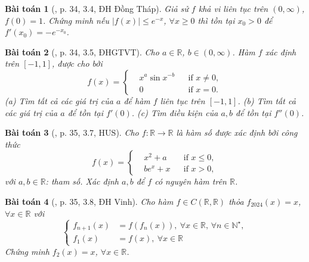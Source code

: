 \documentclass[oneside]{book}
\newtheorem{baitoan}{Bài toán}
\begin{document}
\begin{baitoan}[\cite{VMS_VMC2024}, p. 34, 3.4, ĐH Đồng Tháp]
	Giả sử $f$ khả vi liên tục trên $(0,\infty)$, $f(0) = 1$. Chứng minh nếu $|f(x)|\le e^{-x}$, $\forall x\ge0$ thì tồn tại $x_0 > 0$ để $f'(x_0) = -e^{-x_0}$.
\end{baitoan}

\begin{baitoan}[\cite{VMS_VMC2024}, p. 34, 3.5, ĐHGTVT]
	Cho $a\in\mathbb{R}$, $b\in(0,\infty)$. Hàm $f$ xác định trên $[-1,1]$, được cho bởi
	\begin{equation*}
		f(x) = \left\{\begin{split}
			&x^a\sin x^{-b}&&\mbox{if } x\ne0,\\
			&0&&\mbox{if } x = 0.
		\end{split}\right.
	\end{equation*}
	(a) Tìm tất cả các giá trị của $a$ để hàm $f$ liên tục trên $[-1,1]$. (b) Tìm tất cả các giá trị của $a$ để tồn tại $f'(0)$. (c) Tìm điều kiện của $a,b$ để tồn tại $f''(0)$.
\end{baitoan}

\begin{baitoan}[\cite{VMS_VMC2024}, p. 35, 3.7, HUS]
	Cho $f:\mathbb{R}\to\mathbb{R}$ là hàm số được xác định bởi công thức
	\begin{equation*}
		f(x) = \left\{\begin{split}
			&x^2 + a&&\mbox{if } x\le0,\\
			&be^x + x&&\mbox{if } x > 0,
		\end{split}\right.
	\end{equation*}
	với $a,b\in\mathbb{R}$: tham số. Xác định $a,b$ để $f$ có nguyên hàm trên $\mathbb{R}$.
\end{baitoan}

\begin{baitoan}[\cite{VMS_VMC2024}, p. 35, 3.8, ĐH Vinh]
	Cho hàm $f\in C(\mathbb{R},\mathbb{R})$ thỏa $f_{2024}(x) = x$, $\forall x\in\mathbb{R}$ với
	\begin{equation*}
		\left\{\begin{split}
			f_{n+1}(x) &= f(f_n(x)),\ \forall x\in\mathbb{R},\,\forall n\in\mathbb{N}^\star,\\
			f_1(x) &= f(x),\ \forall x\in\mathbb{R}
		\end{split}\right.
	\end{equation*}
	Chứng minh $f_2(x) = x$, $\forall x\in\mathbb{R}$.
\end{baitoan}
\end{document}
